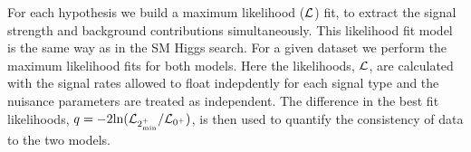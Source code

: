 For each hypothesis we build a maximum likelihood ($\cal L$) fit, 
to extract the signal strength and background contributions simultaneously. 
This likelihood fit model is the same way as in the SM Higgs search. 
For a given dataset we perform the maximum likelihood fits for both models.  
Here the likelihoods, $\cal L$, are calculated with the signal rates 
allowed to float indepdently for each signal type and the nuisance 
parameters are treated as independent. 
The difference in the best fit likelihoods, 
$q=-2\text{ln}({\cal L}_{2_\text{min}^+}/{\cal L}_{\text{0}^+})$, 
is then used to quantify the consistency of data to the two models. 

